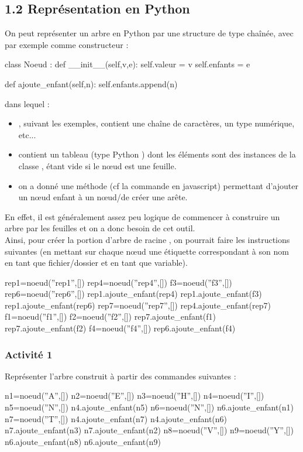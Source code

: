\documentclass[11pt,a4paper,french,twoside]{PMCours}
\begin{document}
\subsection*{\vskip -9mm 1.2 Représentation en Python}
On peut représenter un arbre en Python par une structure de type chaînée, avec par exemple comme constructeur :
\begin{Python}
class Noeud : 
	def __init__(self,v,e):
		self.valeur = v
		self.enfants = e

	def ajoute_enfant(self,n):
		self.enfants.append(n)
\end{Python}
dans lequel :
\begin{itemize}
\item {}, suivant les exemples, contient une chaîne de caractères, un type numérique, etc...
\item {} contient un tableau (type Python ) dont les éléments sont des instances de la classe ,  étant vide si le nœud est une feuille.   
\item on a donné une méthode  (cf la commande  en javascript) permettant d'ajouter un nœud enfant  à un nœud/de créer une arête. 
\end{itemize}
En effet, il est généralement assez peu logique de commencer à construire un arbre par les feuilles et on a donc besoin de cet outil. \medskip\\
Ainsi, pour créer la portion d'arbre de racine , on pourrait faire les instructions suivantes (en mettant sur chaque nœud une étiquette correspondant à son nom en tant que fichier/dossier et en tant que variable).
\begin{multicols}{2}
\begin{Python}
rep1=noeud(''rep1'',[])
rep4=noeud(''rep4'',[])
f3=noeud(''f3'',[])
rep6=noeud(''rep6'',[])
rep1.ajoute_enfant(rep4)
rep1.ajoute_enfant(f3)
rep1.ajoute_enfant(rep6)
rep7=noeud(''rep7'',[])
rep4.ajoute_enfant(rep7)
f1=noeud(''f1'',[])
f2=noeud(''f2'',[])
rep7.ajoute_enfant(f1)
rep7.ajoute_enfant(f2)
f4=noeud(''f4'',[])
rep6.ajoute_enfant(f4)
\end{Python}
\end{multicols}

\newpage
\subsubsection*{Activité 1}
Représenter l'arbre construit à partir des commandes suivantes : 
\begin{multicols}{2}
\begin{Python}
n1=noeud(''A'',[])
n2=noeud(''E'',[])
n3=noeud(''H'',[])
n4=noeud(''I'',[])
n5=noeud(''N'',[])
n4.ajoute_enfant(n5)
n6=noeud(''N'',[])
n6.ajoute_enfant(n1)
n7=noeud(''T'',[])
n4.ajoute_enfant(n7)
n4.ajoute_enfant(n6)
n7.ajoute_enfant(n3)
n7.ajoute_enfant(n2)
n8=noeud(''V'',[])
n9=noeud(''Y'',[])
n6.ajoute_enfant(n8)
n6.ajoute_enfant(n9)
\end{Python}
\end{multicols}
\end{document}
